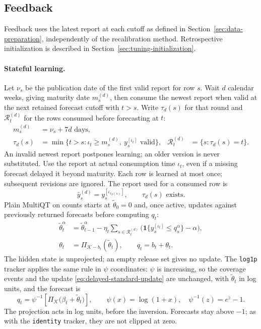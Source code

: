 \documentclass[11pt,a4paper]{article}
\newcommand{\K}{\mathcal{K}}
\newcommand{\ind}{\mathbf{1}}
\theoremstyle{definition}
\theoremstyle{remark}
\begin{document}
\subsection{Feedback}
\label{sec:feedback-designs}
\label{sec:delayed-feedback}
Feedback uses the latest report at each cutoff as defined in
Section~\ref{sec:data-preparation}, independently of the recalibration
method. Retrospective initialization is described in
Section~\ref{sec:tuning-initialization}.

\paragraph{Stateful learning.}
Let $\nu_s$ be the publication date of the first valid report for row $s$.
Wait $d$ calendar weeks, giving maturity date $m_s^{(d)}$, then consume
the newest report when valid at the next retained forecast cutoff with
$t>s$. Write $\tau_d(s)$ for that round and $\mathcal R_t^{(d)}$ for
the rows consumed before forecasting at $t$:
\begin{align}
 m_s^{(d)}&=\nu_s+7d\text{ days},
 \label{eq:feedback-maturity}\\
 \tau_d(s)&=\min\{t>s:\iota_t\ge m_s^{(d)},\ y_s^{[\iota_t]}\text{ valid}\},
 &\mathcal R_t^{(d)}&=\{s:\tau_d(s)=t\}.
 \label{eq:feedback-release-set}
\end{align}
An invalid newest report postpones learning; an older version is never
substituted. Use the report at actual consumption time $\iota_t$, even
if a missing forecast delayed it beyond maturity. Each row is learned
at most once; subsequent revisions are ignored.
The report used for a consumed row is
\begin{equation}
 \bar y_s^{(d)}=y_s^{[\iota_{\tau_d(s)}]},\qquad \tau_d(s)\text{ exists}.
 \label{eq:initial-feedback-values}
\end{equation}
Plain MultiQT on counts starts at $\tilde\theta_0=0$ and, once active,
updates against previously returned forecasts before computing $q_t$:
\begin{align}
 \tilde\theta_t^\alpha
 &=\tilde\theta_{t-1}^\alpha-\eta_t
   \sum_{s\in\mathcal R_t^{(d)}}
   \bigl(\ind\{y_s^{[\iota_t]}\le q_s^\alpha\}-\alpha\bigr),
 \label{eq:delayed-standard-update}\\
 \theta_t&=\Pi_{\K-b_t}(\tilde\theta_t),\qquad q_t=b_t+\theta_t.
 \label{eq:delayed-standard-forecast}
\end{align}
The hidden state is unprojected; an empty release set gives no update.
The \texttt{log1p} tracker applies the same rule in $\psi$ coordinates:
$\psi$ is increasing, so the coverage events and the update
\eqref{eq:delayed-standard-update} are unchanged, with $\tilde\theta_t$
in log units, and the forecast is
\begin{equation}
 q_t=\psi^{-1}\!\left[\Pi_\K\bigl(\beta_t+\tilde\theta_t\bigr)\right],
 \qquad\psi(x)=\log(1+x),\quad\psi^{-1}(z)=e^z-1.
 \label{eq:log-standard-forecast}
\end{equation}
The projection acts in log units, before the inversion. Forecasts stay
above $-1$; as with the \texttt{identity} tracker, they are not clipped
at zero.
\end{document}

